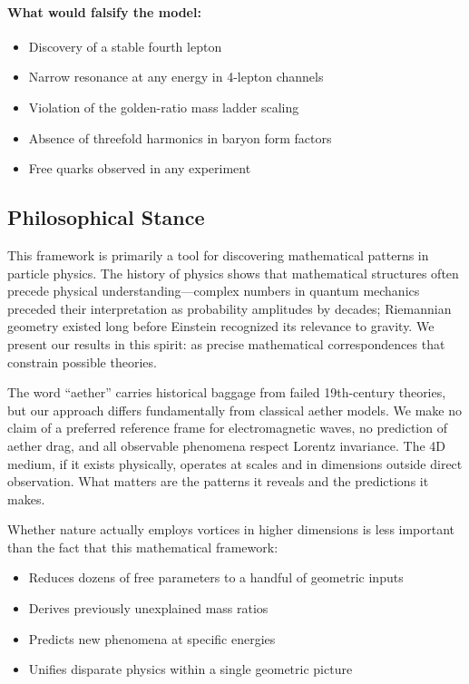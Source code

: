 \paragraph{What would falsify the model:}
\begin{itemize}
\item Discovery of a stable fourth lepton
\item Narrow resonance at any energy in 4-lepton channels
\item Violation of the golden-ratio mass ladder scaling
\item Absence of threefold harmonics in baryon form factors
\item Free quarks observed in any experiment
\end{itemize}

\subsection{Philosophical Stance}

This framework is primarily a tool for discovering mathematical patterns in particle physics. The history of physics shows that mathematical structures often precede physical understanding---complex numbers in quantum mechanics preceded their interpretation as probability amplitudes by decades; Riemannian geometry existed long before Einstein recognized its relevance to gravity. We present our results in this spirit: as precise mathematical correspondences that constrain possible theories.

The word ``aether'' carries historical baggage from failed 19th-century theories, but our approach differs fundamentally from classical aether models. We make no claim of a preferred reference frame for electromagnetic waves, no prediction of aether drag, and all observable phenomena respect Lorentz invariance. The 4D medium, if it exists physically, operates at scales and in dimensions outside direct observation. What matters are the patterns it reveals and the predictions it makes.

Whether nature actually employs vortices in higher dimensions is less important than the fact that this mathematical framework:
\begin{itemize}
\item Reduces dozens of free parameters to a handful of geometric inputs
\item Derives previously unexplained mass ratios
\item Predicts new phenomena at specific energies
\item Unifies disparate physics within a single geometric picture
\end{itemize}

